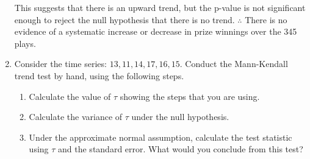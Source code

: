 \documentclass[12pt]{article}
\begin{document}
\begin{enumerate}
\begin{verbatim}
    \end{verbatim}
    This suggests that there is an upward trend, but the p-value 
    is not significant enough to reject the null hypothesis that there is no trend.
    $\therefore$ There is no evidence of a systematic increase or decrease in prize winnings over the 345 plays.
    \item Consider the time series: $13, 11, 14, 17, 16, 15$.
    Conduct the Mann-Kendall trend test by hand, using the following steps.
    \begin{enumerate}
        \item Calculate the value of $\tau$ showing the steps that you are using.
        
        \item Calculate the variance of $\tau$ under the null hypothesis.
        
        \item Under the approximate normal assumption, calculate the test statistic using \(\tau\) and the standard error. 
        What would you conclude from this test?
        
    \end{enumerate}
\end{enumerate}
\end{document}
